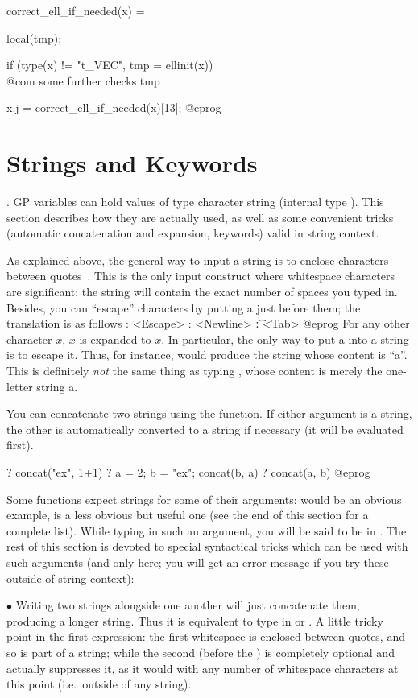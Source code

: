 \bprog
correct_ell_if_needed(x) =
{ local(tmp);

  if (type(x) != "t_VEC", tmp = ellinit(x))
    \\ @com some further checks
  tmp
}
x.j = correct_ell_if_needed(x)[13];
@eprog

\section{Strings and Keywords}
\label{se:strings}

. GP variables can hold values of type character string
(internal type ). This section describes how they are actually used,
as well as some convenient tricks (automatic concatenation and expansion,
keywords) valid in string context.

As explained above, the general way to input a string is to enclose
characters between quotes~. This is the only input construct where
whitespace characters are significant: the string will contain the exact
number of spaces you typed in. Besides, you can ``escape'' characters by
putting a \kbd{\bs} just before them; the translation is as follows
\bprog
   \e: <Escape>
   \n: <Newline>
   \t: <Tab>
@eprog
For any other character $x$, \b{$x$} is expanded to $x$. In particular, the
only way to put a  into a string is to escape it. Thus, for
instance,  would produce the string whose content is
``a''. This is definitely \emph{not} the same thing as typing ,
whose content is merely the one-letter string a.

You can concatenate two strings using the  function. If either
argument is a string, the other is automatically converted to a string if
necessary (it will be evaluated first).

\bprog
? concat("ex", 1+1)
? a = 2; b = "ex"; concat(b, a)
? concat(a, b)
@eprog

Some functions expect strings for some of their arguments:  would
be an obvious example,  is a less obvious but useful one (see the
end of this section for a complete list). While typing in such an argument,
you will be said to be in . The rest of this section is
devoted to special syntactical tricks which can be used with such arguments
(and only here; you will get an error message if you try these outside of
string context):

$\bullet$ Writing two strings alongside one another will just concatenate
them, producing a longer string. Thus it is equivalent to type in
 or . A little tricky point in the first expression:
the first whitespace is enclosed between quotes, and so is part of a string;
while the second (before the ) is completely optional and 
actually suppresses it, as it would with any number of whitespace characters
at this point (i.e.~outside of any string).

